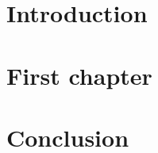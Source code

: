 \documentclass[12pt, a4paper]{article}
\numberwithin{equation}{section} 	%
\begin{document}


\newpage
\section*{Introduction}
\noindent

\newpage
\section{First chapter}
\noindent







\newpage
\section{Conclusion}
\noindent

\newpage
\begin{thebibliography}{99}


\end{thebibliography}
\end{document}
